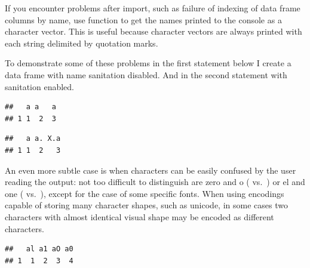\documentclass[krantz2]{krantz}\usepackage{knitr}%
\begin{document}
\begin{warningbox}
If you encounter problems after import, such as failure of indexing of data frame columns by name, use function  to get the names printed to the console as a character vector. This is useful because character vectors are always printed with each string delimited by quotation marks.

To demonstrate some of these problems in the first statement below I create a data frame with name sanitation disabled. And in the second statement with sanitation enabled.
\begin{knitrout}\footnotesize
{}\color{fgcolor}\begin{kframe}
\begin{alltt}
\hlstd{(} \hlstd{=} \hlstd{,}  \hlstd{=} \hlstd{,}  \hlstd{=} \hlstd{,}  \hlstd{=} \hlstd{)}
\end{alltt}
\begin{verbatim}
##   a a   a
## 1 1  2  3
\end{verbatim}
\begin{alltt}
\hlstd{(} \hlstd{=} \hlstd{,}  \hlstd{=} \hlstd{,}  \hlstd{=} \hlstd{)}
\end{alltt}
\begin{verbatim}
##   a a. X.a
## 1 1  2   3
\end{verbatim}
\end{kframe}
\end{knitrout}

An even more subtle case is when characters can be easily confused by the user reading the output: not too difficult to distinguish are zero and o ( vs.\ ) or el and one ( vs.\ ), except for the case of some specific fonts. When using encodings capable of storing many character shapes, such as unicode, in some cases two characters with almost identical visual shape may be encoded as different characters.

\begin{knitrout}\footnotesize
{}\color{fgcolor}\begin{kframe}
\begin{alltt}
\hlstd{(} \hlstd{=} \hlstd{,}  \hlstd{=} \hlstd{,}  \hlstd{=} \hlstd{,}  \hlstd{=} \hlstd{)}
\end{alltt}
\begin{verbatim}
##   al a1 aO a0
## 1  1  2  3  4
\end{verbatim}
\end{kframe}
\end{knitrout}


\end{warningbox}
\end{document}
